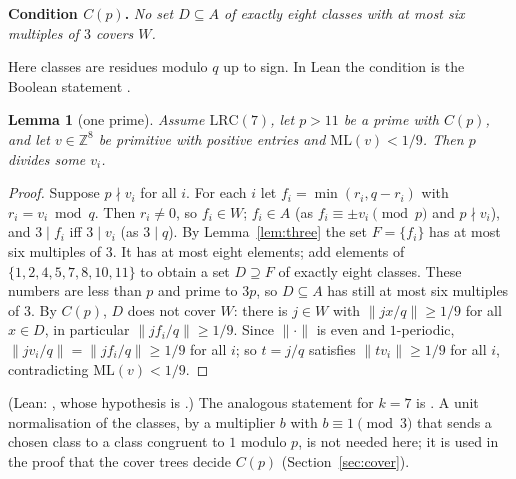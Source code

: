 \documentclass[11pt]{article}
\newtheorem{lemma}[theorem]{Lemma}
\theoremstyle{remark}
\newcommand{\ML}{\mathrm{ML}}
\newcommand{\Z}{\mathbb{Z}}
\newcommand{\dist}[1]{\lVert #1\rVert}
\begin{document}
\medskip\noindent\textbf{Condition $C(p)$.} \emph{No set $D\subseteq A$ of exactly eight classes with at most six multiples of $3$ covers $W$.}

Here classes are residues modulo $q$ up to sign. In Lean the condition is the Boolean statement .

\begin{lemma}[one prime]\label{lem:prime}
Assume $\mathrm{LRC}(7)$, let $p>11$ be a prime with $C(p)$, and let $v\in\Z^8$ be primitive with positive entries and $\ML(v)<1/9$. Then $p$ divides some $v_i$.
\end{lemma}
\begin{proof}
Suppose $p\nmid v_i$ for all $i$. For each $i$ let $f_i=\min(r_i,q-r_i)$ with $r_i=v_i\bmod q$. Then $r_i\neq0$, so $f_i\in W$; $f_i\in A$ (as $f_i\equiv\pm v_i\pmod p$ and $p\nmid v_i$), and $3\mid f_i$ iff $3\mid v_i$ (as $3\mid q$). By Lemma~\ref{lem:three} the set $F=\{f_i\}$ has at most six multiples of $3$. It has at most eight elements; add elements of $\{1,2,4,5,7,8,10,11\}$ to obtain a set $D\supseteq F$ of exactly eight classes. These numbers are less than $p$ and prime to $3p$, so $D\subseteq A$ has still at most six multiples of $3$. By $C(p)$, $D$ does not cover $W$: there is $j\in W$ with $\dist{jx/q}\ge1/9$ for all $x\in D$, in particular $\dist{jf_i/q}\ge 1/9$. Since $\dist{\cdot}$ is even and $1$-periodic, $\dist{jv_i/q}=\dist{jf_i/q}\ge1/9$ for all $i$; so $t=j/q$ satisfies $\dist{tv_i}\ge 1/9$ for all $i$, contradicting $\ML(v)<1/9$.
\end{proof}
(Lean: , whose hypothesis is .) The analogous statement for $k=7$ is . A unit normalisation of the classes, by a multiplier $b$ with $b\equiv1\pmod 3$ that sends a chosen class to a class congruent to $1$ modulo $p$, is not needed here; it is used in the proof that the cover trees decide $C(p)$ (Section~\ref{sec:cover}).
\end{document}

